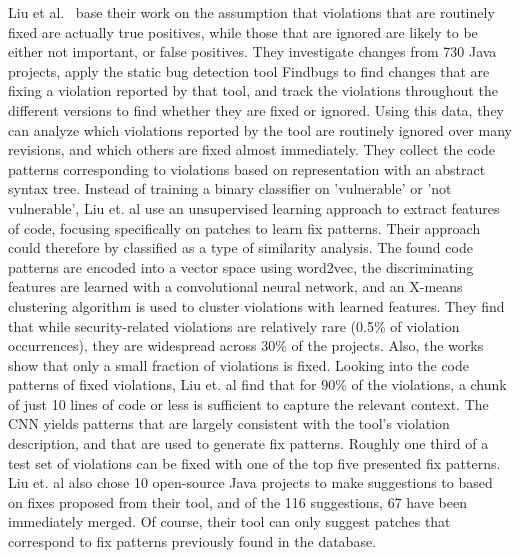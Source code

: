 \documentclass[
a4paper,
pagesize,
pdftex,
12pt,
twoside, %
BCOR=5mm, %
ngerman,
fleqn,
final,
]{scrartcl}
\begin{document}
	Liu et al.~\cite{Liu.2018} base their work on the assumption that violations that are routinely fixed are actually true positives, while those that are ignored are likely to be either not important, or false positives. They investigate changes from 730 Java projects, apply the static bug detection tool Findbugs to find changes that are fixing a violation reported by that tool, and track the violations throughout the different versions to find whether they are fixed or ignored. Using this data, they can analyze which violations reported by the tool are routinely ignored over many revisions, and which others are fixed almost immediately. They collect the code patterns corresponding to violations based on representation with an abstract syntax tree. Instead of training a binary classifier on 'vulnerable' or 'not vulnerable', Liu et. al use an unsupervised learning approach to extract features of code, focusing specifically on patches to learn fix patterns. Their approach could therefore by classified as a type of similarity analysis. The found code patterns are encoded into a vector space using word2vec, the discriminating features are learned with a convolutional neural network, and an X-means clustering algorithm is used to cluster violations with learned features. They find that while security-related violations are relatively rare (0.5\% of violation occurrences), they are widespread across 30\% of the projects. Also, the works show that only a small fraction of violations is fixed. Looking into the code patterns of fixed violations, Liu et. al find that for 90\% of the violations, a chunk of just 10 lines of code or less is sufficient to capture the relevant context. The CNN yields patterns that are largely consistent with the tool's violation description, and that are used to generate fix patterns. Roughly one third of a test set of violations can be fixed with one of the top five presented fix patterns. Liu et. al also chose 10 open-source Java projects to make suggestions to based on fixes proposed from their tool, and of the 116 suggestions, 67 have been immediately merged. Of course, their tool can only suggest patches that correspond to fix patterns previously found in the database. \\
\end{document}
